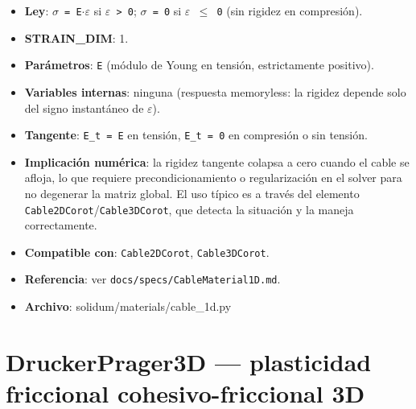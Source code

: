 \documentclass[11pt,letterpaper,oneside]{report}
\begin{document}
\begin{itemize}
  \item \textbf{Ley}: \texttt{\ensuremath{\sigma} = E\ensuremath{\cdot}\ensuremath{\varepsilon}} si \texttt{\ensuremath{\varepsilon} > 0}; \texttt{\ensuremath{\sigma} = 0} si \texttt{\ensuremath{\varepsilon} \ensuremath{\le} 0} (sin rigidez en compresión).
  \item \textbf{STRAIN\_DIM}: 1.
  \item \textbf{Parámetros}: \texttt{E} (módulo de Young en tensión, estrictamente positivo).
  \item \textbf{Variables internas}: ninguna (respuesta memoryless: la rigidez depende solo del signo instantáneo de \texttt{\ensuremath{\varepsilon}}).
  \item \textbf{Tangente}: \texttt{E\_t = E} en tensión, \texttt{E\_t = 0} en compresión o sin tensión.
  \item \textbf{Implicación numérica}: la rigidez tangente colapsa a cero cuando el cable se afloja, lo que requiere precondicionamiento o regularización en el solver para no degenerar la matriz global. El uso típico es a través del elemento \texttt{Cable2DCorot}/\texttt{Cable3DCorot}, que detecta la situación y la maneja correctamente.
  \item \textbf{Compatible con}: \texttt{Cable2DCorot}, \texttt{Cable3DCorot}.
  \item \textbf{Referencia}: ver \texttt{docs/specs/CableMaterial1D.md}.
  \item \textbf{Archivo}: solidum/materials/cable\_1d.py
\end{itemize}


\section{DruckerPrager3D --- plasticidad friccional cohesivo-friccional 3D}
\end{document}
